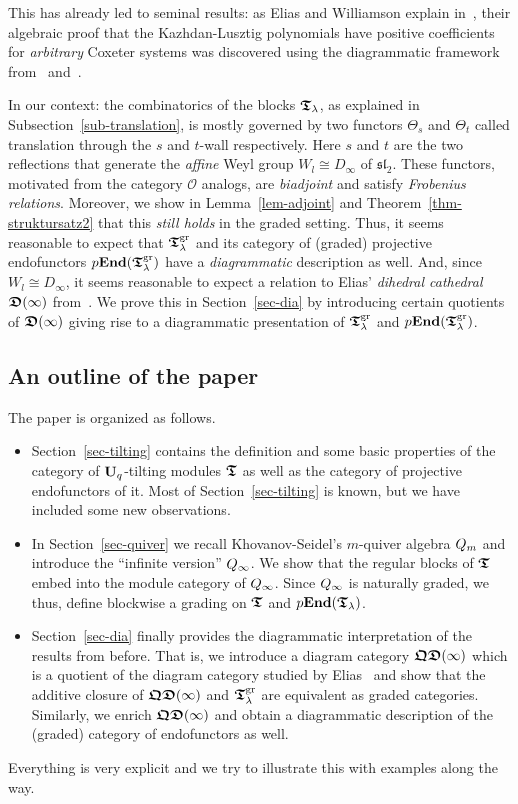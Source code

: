 This has already led to seminal results: 
as Elias and Williamson explain in~\cite[Subsection~1.3]{ew2}, 
their algebraic proof that the Kazhdan-Lusztig polynomials have positive 
coefficients for \textit{arbitrary} Coxeter 
systems was discovered using the diagrammatic framework 
from~\cite{ew1} and~\cite{ew3}.



In our context: the combinatorics of the 
blocks $\boldsymbol{\mathfrak{T}}_{\lambda}$, as explained in Subsection~\ref{sub-translation}, 
is mostly governed by two functors $\Theta_s$ 
and $\Theta_t$ called translation through the 
$s$ and $t$-wall respectively. Here 
$s$ and $t$ are the two reflections that generate 
the \textit{affine} Weyl group 
$W_l\cong D_{\infty}$ of $\mathfrak{sl}_2$.
These functors, motivated from the category $\mathcal O$ 
analogs, are \textit{biadjoint} and satisfy 
\textit{Frobenius relations}. Moreover, we show in 
Lemma~\ref{lem-adjoint} and Theorem~\ref{thm-struktursatz2} 
that this \textit{still holds} in the graded setting.
Thus, it seems reasonable to expect that 
$\boldsymbol{\mathfrak{T}}_{\lambda}^{\mathrm{gr}}$ and its category of (graded) projective endofunctors 
$p\boldsymbol{\mathrm{End}}(\boldsymbol{\mathfrak{T}}_{\lambda}^{\mathrm{gr}})$ have a \textit{diagrammatic} 
description as well. And, since $W_l\cong D_{\infty}$, 
it seems reasonable to expect a relation to Elias' \textit{dihedral cathedral} 
$\boldsymbol{\mathfrak{D}}(\infty)$ from~\cite{el1}. We prove this in Section~\ref{sec-dia} by 
introducing certain quotients of $\boldsymbol{\mathfrak{D}}(\infty)$ giving rise to a diagrammatic presentation 
of $\boldsymbol{\mathfrak{T}}_{\lambda}^{\mathrm{gr}}$ and $p\boldsymbol{\mathrm{End}}(\boldsymbol{\mathfrak{T}}_{\lambda}^{\mathrm{gr}})$.





\subsection{An outline of the paper}\label{sub-intropart2}
The paper is organized as follows.
\begin{itemize}
\item Section~\ref{sec-tilting} contains 
the definition and some basic properties of the category 
of $\boldsymbol{\mathrm{U}}_q$-tilting modules $\boldsymbol{\mathfrak{T}}$ as well as the category of projective 
endofunctors of it. Most of Section~\ref{sec-tilting} is known, 
but we have included some new observations.
\item In Section~\ref{sec-quiver} we recall Khovanov-Seidel's $m$-quiver 
algebra $Q_{m}$ and introduce the ``infinite version'' $Q_{\infty}$. 
We show that the regular blocks of 
$\boldsymbol{\mathfrak{T}}$ embed into the
module category of $Q_{\infty}$. 
Since $Q_{\infty}$ is naturally graded, we thus, define 
blockwise a grading on $\boldsymbol{\mathfrak{T}}$ and $p\boldsymbol{\mathrm{End}}(\boldsymbol{\mathfrak{T}}_{\lambda})$.
\item Section~\ref{sec-dia} finally provides the diagrammatic interpretation of the results from before.
That is, we introduce a diagram category $\boldsymbol{\mathfrak{QD}}(\infty)$ which is a quotient of the diagram 
category studied by Elias~\cite{el1} and show that the additive closure of $\boldsymbol{\mathfrak{QD}}(\infty)$ and 
$\boldsymbol{\mathfrak{T}}_{\lambda}^{\mathrm{gr}}$ are equivalent as graded categories. Similarly, we enrich $\boldsymbol{\mathfrak{QD}}(\infty)$ and obtain a 
diagrammatic description of the (graded) category of endofunctors as well.
\end{itemize}
Everything is very explicit and we try to 
illustrate this with examples along the way.

